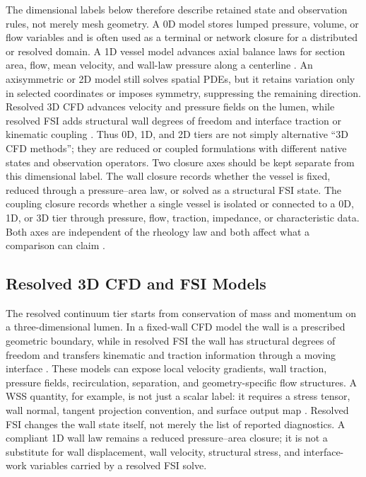 The dimensional labels below therefore describe retained state and observation
rules, not merely mesh geometry. A 0D model stores lumped pressure, volume,
or flow variables and is often used as a terminal or network closure for a
distributed or resolved domain. A 1D vessel model advances axial balance laws
for section area, flow, mean velocity, and wall-law pressure along a centerline
\cite{FormaggiaEtAl2003OneDimensionalBloodFlow,ShiEtAl2011BloodFlowModelReview,KopplHelmig2023DimensionReducedModeling}.
An axisymmetric or 2D model still solves spatial PDEs, but it retains variation
only in selected coordinates or imposes symmetry, suppressing the remaining
direction. Resolved 3D CFD advances velocity and pressure fields on the lumen,
while resolved FSI adds structural wall degrees of freedom and interface
traction or kinematic coupling
\cite{QuarteroniFormaggia2004CardiovascularModeling,FormaggiaEtAl2007FSICoupling}.
Thus 0D, 1D, and 2D tiers are not simply alternative ``3D CFD methods''; they
are reduced or coupled formulations with different native states and observation
operators.
Two closure axes should be kept separate from this dimensional label. The wall
closure records whether the vessel is fixed, reduced through a pressure--area
law, or solved as a structural FSI state. The coupling closure records whether a
single vessel is isolated or connected to a 0D, 1D, or 3D tier through pressure,
flow, traction, impedance, or characteristic data. Both axes are independent of
the rheology law and both affect what a comparison can claim
\cite{FormaggiaEtAl2003OneDimensionalBloodFlow,QuarteroniVeneziani2003GeometricalMultiscale,FormaggiaEtAl2007FSICoupling}.

\subsection{Resolved 3D CFD and FSI Models}
\label{subsec:resolved-reduced-model-tiers}

The resolved continuum tier starts from conservation of mass and momentum on a
three-dimensional lumen. In a fixed-wall CFD model the wall is a prescribed
geometric boundary, while in resolved FSI the wall has structural degrees of
freedom and transfers kinematic and traction information through a moving
interface
\cite{QuarteroniFormaggia2004CardiovascularModeling,FormaggiaEtAl2007FSICoupling}.
These models can expose local velocity gradients, wall traction, pressure
fields, recirculation, separation, and geometry-specific flow structures. A WSS
quantity, for example, is not just a scalar label: it requires a stress tensor,
wall normal, tangent projection convention, and surface output map
\cite{JohnEtAl2017WallShearStressVectorForm}.
Resolved FSI changes the wall state itself, not merely the list of reported
diagnostics. A compliant 1D wall law remains a reduced pressure--area closure;
it is not a substitute for wall displacement, wall velocity, structural stress,
and interface-work variables carried by a resolved FSI solve.

